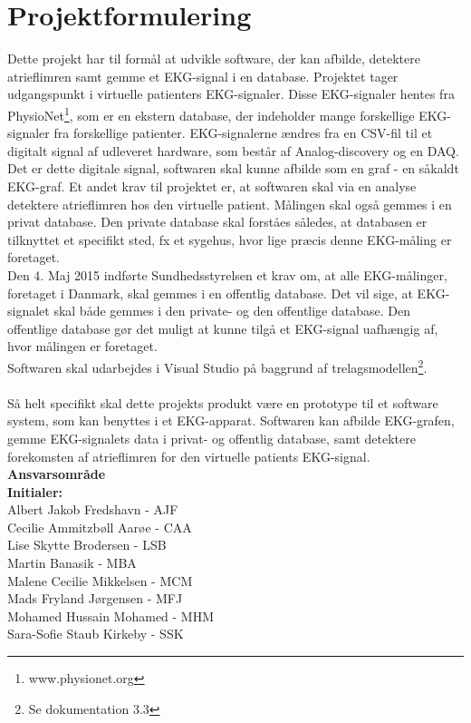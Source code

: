 \chapter{Projektformulering}

Dette projekt har til formål at udvikle software, der kan afbilde, detektere atrieflimren samt gemme et EKG-signal i en database. Projektet tager udgangspunkt i virtuelle patienters EKG-signaler. Disse EKG-signaler hentes fra PhysioNet\footnote{www.physionet.org}, som er en ekstern database, der indeholder mange forskellige EKG-signaler fra forskellige patienter. EKG-signalerne  ændres fra en CSV-fil til et digitalt signal af udleveret hardware, som består af Analog-discovery og en DAQ. \\
Det er dette digitale signal, softwaren skal kunne afbilde som en graf - en såkaldt EKG-graf. Et andet krav til projektet er, at softwaren skal via en analyse detektere atrieflimren hos den virtuelle patient. Målingen skal også gemmes i en privat database. Den private database skal forståes således, at databasen er tilknyttet et specifikt sted, fx et sygehus, hvor lige præcis denne EKG-måling er foretaget. \\
Den 4. Maj 2015 indførte Sundhedsstyrelsen et krav om, at alle EKG-målinger, foretaget i Danmark, skal gemmes i en offentlig database. Det vil sige, at EKG-signalet skal både gemmes i den private- og den offentlige database. Den offentlige database gør det muligt at kunne tilgå et EKG-signal uafhængig af, hvor målingen er foretaget.\\
Softwaren skal udarbejdes i Visual Studio på baggrund af trelagsmodellen\footnote{Se dokumentation 3.3}.\\ \\
Så helt specifikt skal dette projekts produkt være en prototype til et software system, som kan benyttes i et EKG-apparat. Softwaren kan afbilde EKG-grafen, gemme EKG-signalets data i privat- og offentlig database, samt detektere forekomsten af atrieflimren for den virtuelle patients EKG-signal. \\[1ex]


\textbf{Ansvarsområde} \\
\textbf{Initialer: } \\
Albert Jakob Fredshavn - AJF \\
Cecilie Ammitzbøll Aarøe - CAA \\
Lise Skytte Brodersen - LSB \\
Martin Banasik - MBA \\
Malene Cecilie Mikkelsen - MCM \\
Mads Fryland Jørgensen - MFJ \\
Mohamed Hussain Mohamed - MHM \\
Sara-Sofie Staub Kirkeby - SSK \\[2ex]

